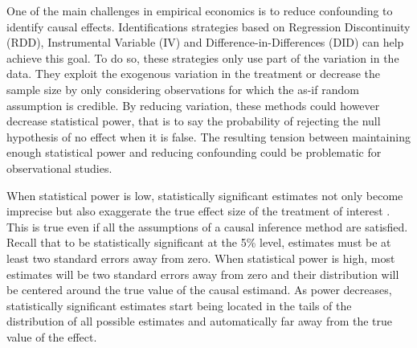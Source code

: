 \documentclass[12pt]{article}
\renewcommand{\thefootnote}{\fnsymbol{footnote}}
\begin{document}
\renewcommand{\thefootnote}{\arabic{footnote}}




One of the main challenges in empirical economics is to reduce confounding to identify causal effects. Identifications strategies based on Regression Discontinuity (RDD), Instrumental Variable (IV) and Difference-in-Differences (DID) can help achieve this goal. To do so, these strategies only use part of the variation in the data. They exploit the exogenous variation in the treatment or decrease the sample size by only considering observations for which the as-if random assumption is credible. By reducing variation, these methods could however decrease statistical power, that is to say the probability of rejecting the null hypothesis of no effect when it is false. The resulting tension between maintaining enough statistical power and reducing confounding could be problematic for observational studies.

When statistical power is low, statistically significant estimates not only become imprecise but also exaggerate the true effect size of the treatment of interest \citep{ioannidis_why_2008, gelman_beyond_2014, lu_note_2019, zwet_significance_2021}. This is true even if all the assumptions of a causal inference method are satisfied. Recall that to be statistically significant at the 5\% level, estimates must be at least two standard errors away from zero. When statistical power is high, most estimates will be two standard errors away from zero and their distribution will be centered around the true value of the causal estimand. As power decreases, statistically significant estimates start being located in the tails of the distribution of all possible estimates and automatically far away from the true value of the effect. 
\end{document}
